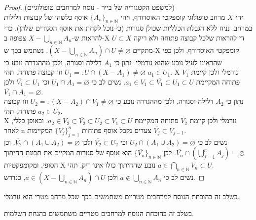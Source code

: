\documentclass{tstextbook}
\begin{document}
\begin{proof}
(למשפט הקטגוריה של בייר - נוסח למרחבים טופולוגיים)\\

יהי \(X\) מרחב טופולוגי קומפקטי האוסדורף, ויהי \(\{A_{n}\}_{n\in\mathbb{N}}\) אוסף כלשהו של קבוצות דלילות במרחב. נניח ללא הגבלת הכלליות שכולן סגורות (כי נוכל לקחת את אוסף הסגורים שלהן).
כדי להראות ש-\(X-\bigcup_{n\in\mathbb{N}}A_{n}\) צפופה ב-X די להראות שלכל קבוצה פתוחה ולא ריקה \(U\subset X\) מתקיים \((X-\bigcup_{n\in\mathbb{N}}A_{n})\cap U\ne\varnothing\).
נשתמש בכך ש-X קומפקטי האוסדורף, ולכן כפי שהראינו לעיל נובע שהוא נורמלי.
נתון כי \(A_{1}\) דלילה וסגורה, ולכן מההגדרה נובע כי \(U_{1}=:U\cap(X-A_{1})\ne\varnothing\) וזו קבוצה פתוחה. תהי \(a_{1}\in U_{1}\).
X נורמלי ולכן קיימת \(V_{1}\) פתוחה המקיימת \(a_{1}\in V_{1}\subset\overline{V_{1}}\subset U_{1}\subset U\).
נשים לב כי \(U_{1}\cap A_{1}=\varnothing\) וכי \(\overline{V_{1}}\subset U_{1}\) ולכן \(\overline{V_{1}}\cap A_{1}=\varnothing\).\\

נתון כי \(A_{2}\) דלילה וסגורה, ולכן מההגדרה נובע כי \(U_{2}=:(X-A_{2})\cap V_{1}\ne\varnothing\) וזו קבוצה פתוחה.
תהי \(a_{2}\in U_{2}\).\\

X נורמלי ולכן קיימת \(V_{2}\) פתוחה המקיימת \(a_{2}\in V_{2}\subset \overline{V_{2}}\subset U_{2}\subset V_{1}\subset U\).
ובאופן כללי, לאחר n צעדים נקבל אוסף פתוחות \(\{V_{j}\}_{j=1}^{n}\) המקיימות \(\overline{V_{j}}\subset V_{j-1}\).\\

נשים לב כי \(U_{2}\cap(A_{1}\cup A_{2})=\varnothing\) וכי \(\overline{V_{2}}\subset U_{2}\) ולכן \(\overline{V_{2}}\cap(A_{1}\cup A_{2})=\varnothing\).
וכן \(\overline{V_{n}}\cap(\bigcup_{j=1}^{n}A_{j})=\varnothing\).
לכן \(\{\overline{V_{n}}\}_{n\in\mathbb{N}}\) הוא אוסף של סגורות המקיים את תכונת החיתוך הסופי, ומקומפקטיות X נובע שהחיתוך כולו אינו ריק.
תהי \(a\in\bigcap_{n\in\mathbb{N}}\overline{V_{n}}\subset U\).\\

נשים לב כי \(a\notin\bigcup_{n\in\mathbb{N}}A_{n}\) ולכן \(a\in(X-\bigcup_{n\in\mathbb{N}}A_{n})\cap U\), כנדרש.

\end{proof}
\begin{remark}
בשלב זה בהוכחת הנוסח למרחבים מטריים משתמשים בכך שכל מרחב מטרי הוא נורמלי.  

\end{remark}
\begin{remark}
בשלב זה בהוכחת הנוסח למרחבים מטריים משתמשים בהנחת השלמות.  

\end{remark}
\end{document}
